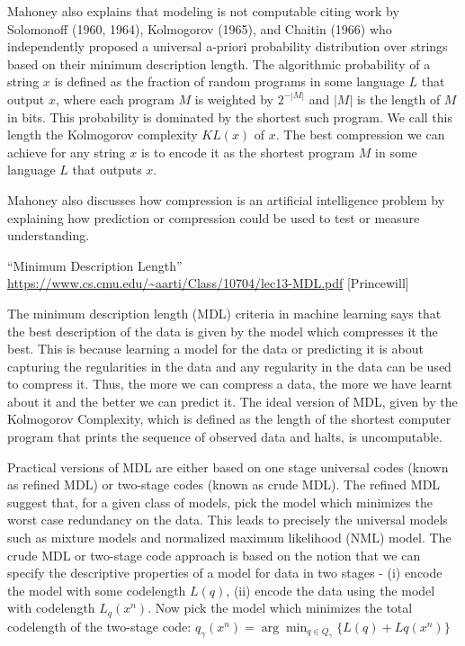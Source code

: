 \documentclass[12pt]{article}
\begin{document}
Mahoney also explains that modeling is not computable citing work by Solomonoff (1960, 1964), Kolmogorov (1965), and Chaitin (1966) who independently proposed a universal a-priori probability distribution over strings based on their minimum description length. The algorithmic probability of a string $x$ is defined as the fraction of random programs in some language $L$ that output $x$, where each program $M$ is weighted by $2^{-|M|}$ and $|M|$ is the length of $M$ in bits. This probability is dominated by the shortest such program. We call this length the Kolmogorov complexity $KL(x)$ of $x$.
The best compression we can achieve for any string $x$ is to encode it as the shortest program $M$ in some language $L$ that outputs $x$.

Mahoney also discusses how compression is an artificial intelligence problem by explaining how prediction or compression could be used to test or measure understanding.

``Minimum Description Length” \url{https://www.cs.cmu.edu/~aarti/Class/10704/lec13-MDL.pdf} [Princewill]

The minimum description length (MDL) criteria in machine learning says that the best description of the data is given by the model which compresses it the best. This is because learning a model for the data or predicting it is about capturing the regularities in the data and any regularity in the data can be used to compress it. Thus, the more we can compress a data, the more we have learnt about it and the better we can predict it. The ideal version of MDL, given by the Kolmogorov Complexity, which is defined as the length of the shortest computer program that prints the sequence of observed data and halts, is uncomputable.

Practical versions of MDL are either based on one stage universal codes (known as refined MDL) or two-stage codes (known as crude MDL). The refined MDL suggest that, for a given class of models, pick the model which minimizes the worst case redundancy on the data. This leads to precisely the universal models such as mixture models and normalized maximum likelihood (NML) model. The crude MDL or two-stage code approach is based on the notion that we can specify the descriptive properties of a model for data in two stages - (i) encode the model with some codelength $L(q)$, (ii) encode the data using the model with codelength $L_q(x^n)$. Now pick the model which minimizes the total codelength of the two-stage code: $q_\gamma(x^n) = \arg \min_{q\in Q_\gamma} \{L(q) + Lq(x^n)\}$
\end{document}
